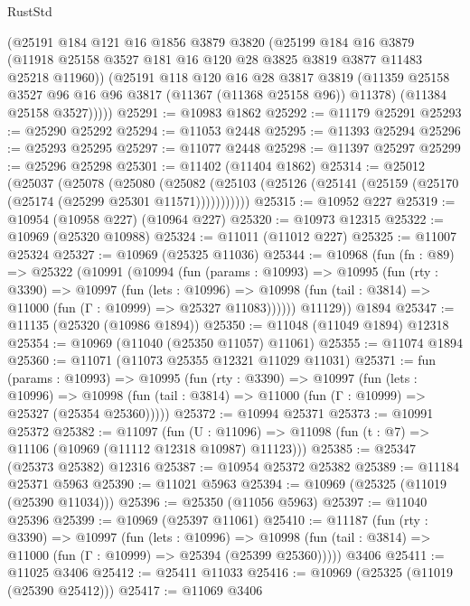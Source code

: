 \begin{lexlean}{RustStd}
\begin{coremodule}
        (@25191
          @184
          @121
          @16
          @1856
          @3879
          @3820
          (@25199
            @184
            @16
            @3879
            (@11918 @25158 @3527 @181 @16 @120 @28 @3825 @3819 @3877 @11483 @25218 @11960))
          (@25191
            @118
            @120
            @16
            @28
            @3817
            @3819
            (@11359 @25158 @3527 @96 @16 @96 @3817 (@11367 (@11368 @25158 @96)) @11378)
            (@11384 @25158 @3527)))))
@25291 := @10983 @1862
@25292 := @11179 @25291
@25293 := @25290 @25292
@25294 := @11053 @2448
@25295 := @11393 @25294
@25296 := @25293 @25295
@25297 := @11077 @2448
@25298 := @11397 @25297
@25299 := @25296 @25298
@25301 := @11402 (@11404 @1862)
@25314 := @25012
    (@25037
      (@25078
        (@25080
          (@25082 (@25103 (@25126 (@25141 (@25159 (@25170 (@25174 (@25299 @25301 @11571)))))))))))
@25315 := @10952 @227
@25319 := @10954 (@10958 @227) (@10964 @227)
@25320 := @10973 @12315
@25322 := @10969 (@25320 @10988)
@25324 := @11011 (@11012 @227)
@25325 := @11007 @25324
@25327 := @10969 (@25325 @11036)
@25344 := @10968
    (fun (fn : @89) =>
    @25322
      (@10991
        (@10994
          (fun (params : @10993) =>
          @10995
            (fun (rty : @3390) =>
            @10997
              (fun (lets : @10996) =>
              @10998 (fun (tail : @3814) => @11000 (fun (Γ : @10999) => @25327 @11083))))))
        @11129))
    @1894
@25347 := @11135 (@25320 (@10986 @1894))
@25350 := @11048 (@11049 @1894) @12318
@25354 := @10969 (@11040 (@25350 @11057) @11061)
@25355 := @11074 @1894
@25360 := @11071 (@11073 @25355 @12321 @11029 @11031)
@25371 := fun (params : @10993) =>
  @10995
    (fun (rty : @3390) =>
    @10997
      (fun (lets : @10996) =>
      @10998 (fun (tail : @3814) => @11000 (fun (Γ : @10999) => @25327 (@25354 @25360)))))
@25372 := @10994 @25371
@25373 := @10991 @25372
@25382 := @11097
    (fun (U : @11096) => @11098 (fun (t : @7) => @11106 (@10969 (@11112 @12318 @10987) @11123)))
@25385 := @25347 (@25373 @25382) @12316
@25387 := @10954 @25372 @25382
@25389 := @11184 @25371 @5963
@25390 := @11021 @5963
@25394 := @10969 (@25325 (@11019 (@25390 @11034)))
@25396 := @25350 (@11056 @5963)
@25397 := @11040 @25396
@25399 := @10969 (@25397 @11061)
@25410 := @11187
    (fun (rty : @3390) =>
    @10997
      (fun (lets : @10996) =>
      @10998 (fun (tail : @3814) => @11000 (fun (Γ : @10999) => @25394 (@25399 @25360)))))
    @3406
@25411 := @11025 @3406
@25412 := @25411 @11033
@25416 := @10969 (@25325 (@11019 (@25390 @25412)))
@25417 := @11069 @3406

\end{coremodule}
\end{lexlean}
